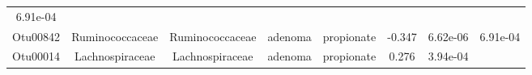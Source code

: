 \documentclass[11pt,]{article}
\begin{document}
\begin{longtable}[]{@{}cccccccc@{}}
\begin{minipage}[t]{0.08\columnwidth}
6.91e-04\strut
\end{minipage}\tabularnewline
\begin{minipage}[t]{0.08\columnwidth}\centering\strut
Otu00842\strut
\end{minipage} & \begin{minipage}[t]{0.15\columnwidth}\centering\strut
Ruminococcaceae\strut
\end{minipage} & \begin{minipage}[t]{0.15\columnwidth}\centering\strut
Ruminococcaceae\strut
\end{minipage} & \begin{minipage}[t]{0.08\columnwidth}\centering\strut
adenoma\strut
\end{minipage} & \begin{minipage}[t]{0.09\columnwidth}\centering\strut
propionate\strut
\end{minipage} & \begin{minipage}[t]{0.07\columnwidth}\centering\strut
-0.347\strut
\end{minipage} & \begin{minipage}[t]{0.08\columnwidth}\centering\strut
6.62e-06\strut
\end{minipage} & \begin{minipage}[t]{0.08\columnwidth}\centering\strut
6.91e-04\strut
\end{minipage}\tabularnewline
\begin{minipage}[t]{0.08\columnwidth}\centering\strut
Otu00014\strut
\end{minipage} & \begin{minipage}[t]{0.15\columnwidth}\centering\strut
Lachnospiraceae\strut
\end{minipage} & \begin{minipage}[t]{0.15\columnwidth}\centering\strut
Lachnospiraceae\strut
\end{minipage} & \begin{minipage}[t]{0.08\columnwidth}\centering\strut
adenoma\strut
\end{minipage} & \begin{minipage}[t]{0.09\columnwidth}\centering\strut
propionate\strut
\end{minipage} & \begin{minipage}[t]{0.07\columnwidth}\centering\strut
0.276\strut
\end{minipage} & \begin{minipage}[t]{0.08\columnwidth}\centering\strut
3.94e-04\strut
\end{minipage} & \begin{minipage}[t]{0.08\columnwidth}\centering\strut

\end{minipage}
\end{longtable}
\end{document}
